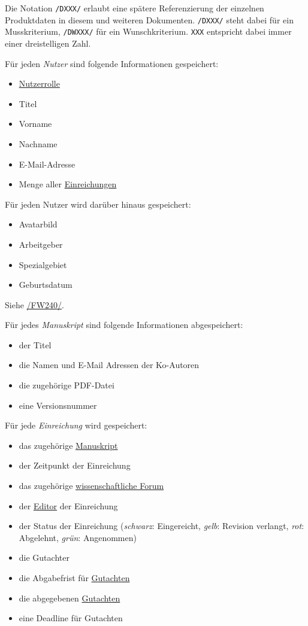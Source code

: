 
Die Notation \texttt{/DXXX/} erlaubt eine spätere Referenzierung der einzelnen Produktdaten in diesem und weiteren
Dokumenten. \texttt{/DXXX/} steht dabei für ein Musskriterium, \texttt{/DWXXX/} für ein Wunschkriterium. \texttt{XXX} entspricht dabei immer einer dreistelligen Zahl.

\begin{description}

	 Für jeden \emph{Nutzer} sind folgende Informationen gespeichert:
	\begin{itemize}
		\item \hyperref[funkt:nutzer]{Nutzerrolle}
		\item Titel
		\item Vorname
		\item Nachname
		\item E-Mail-Adresse
		\item Menge aller \hyperref[d025]{Einreichungen}
	\end{itemize}

	 Für jeden Nutzer wird darüber hinaus gespeichert:
	\begin{itemize}
		\item Avatarbild
		\item Arbeitgeber
		\item Spezialgebiet
		\item Geburtsdatum
	\end{itemize}
	Siehe \hyperref[funkt:240]{/FW240/}.

	 Für jedes \emph{Manuskript} sind folgende Informationen abgespeichert:
	\begin{itemize}
		\item der Titel
		\item die Namen und E-Mail Adressen der Ko-Autoren
		\item die zugehörige PDF-Datei
		\item eine Versionsnummer
	\end{itemize}

	 Für jede \emph{Einreichung} wird gespeichert:
	\begin{itemize}
		\item das zugehörige \hyperref[d020]{Manuskript}
		\item der Zeitpunkt der Einreichung
		\item das zugehörige \hyperref[d030]{wissenschaftliche Forum}
		\item der \hyperref[funkt:editor]{Editor} der Einreichung
		\item der Status der Einreichung (\emph{schwarz}: Eingereicht, \emph{gelb}: Revision verlangt, \emph{rot}: Abgelehnt, \emph{grün}: Angenommen)
		\item die Gutachter
		\item die Abgabefrist für \hyperref[d040]{Gutachten}
		\item die abgegebenen \hyperref[d040]{Gutachten}
		\item eine Deadline für Gutachten
	\end{itemize}


\end{description}
